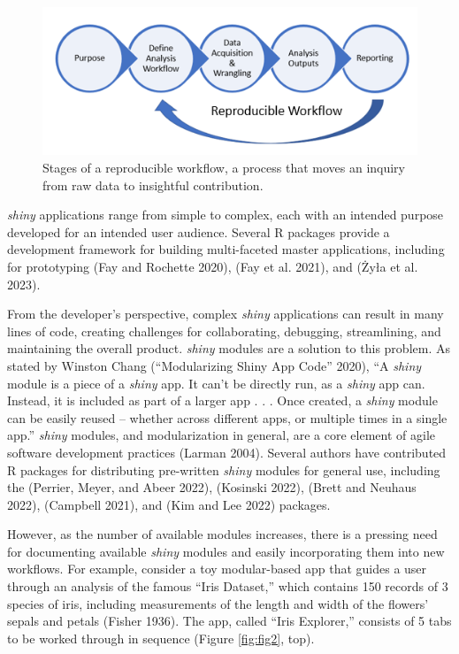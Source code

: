 \begin{figure}
\includegraphics[width=1\linewidth]{images/figure1} \caption{Stages of a reproducible workflow, a process that moves an inquiry from raw data to insightful contribution.}\label{fig:fig1}
\end{figure}

\emph{shiny} applications range from simple to complex, each with an intended purpose developed for an intended user audience. Several R packages provide a development framework for building multi-faceted master applications, including  for prototyping (Fay and Rochette 2020),  (Fay et al. 2021), and  (Żyła et al. 2023).

From the developer's perspective, complex \emph{shiny} applications can result in many lines of code, creating challenges for collaborating, debugging, streamlining, and maintaining the overall product. \emph{shiny} modules are a solution to this problem. As stated by Winston Chang ({``Modularizing Shiny App Code''} 2020), ``A \emph{shiny} module is a piece of a \emph{shiny} app. It can't be directly run, as a \emph{shiny} app can. Instead, it is included as part of a larger app . . . Once created, a \emph{shiny} module can be easily reused -- whether across different apps, or multiple times in a single app.'' \emph{shiny} modules, and modularization in general, are a core element of agile software development practices (Larman 2004). Several authors have contributed R packages for distributing pre-written \emph{shiny} modules for general use, including the  (Perrier, Meyer, and Abeer 2022),  (Kosinski 2022),  (Brett and Neuhaus 2022),  (Campbell 2021), and  (Kim and Lee 2022) packages.

However, as the number of available modules increases, there is a pressing need for documenting available \emph{shiny} modules and easily incorporating them into new workflows. For example, consider a toy modular-based app that guides a user through an analysis of the famous ``Iris Dataset,'' which contains 150 records of 3 species of iris, including measurements of the length and width of the flowers' sepals and petals (Fisher 1936). The app, called ``Iris Explorer,'' consists of 5 tabs to be worked through in sequence (Figure \ref{fig:fig2}, top).

